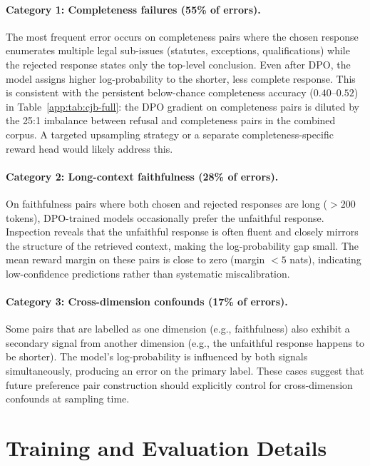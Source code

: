 \documentclass{article}
\theoremstyle{plain}
\theoremstyle{definition}
\theoremstyle{remark}
\begin{document}
\paragraph{Category 1: Completeness failures (55\% of errors).}
The most frequent error occurs on completeness pairs where the chosen response enumerates multiple legal sub-issues (statutes, exceptions, qualifications) while the rejected response states only the top-level conclusion.  Even after DPO, the model assigns higher log-probability to the shorter, less complete response.  This is consistent with the persistent below-chance completeness accuracy ($0.40$--$0.52$) in Table~\ref{app:tab:cjb-full}: the DPO gradient on completeness pairs is diluted by the 25:1 imbalance between refusal and completeness pairs in the combined corpus.  A targeted upsampling strategy or a separate completeness-specific reward head would likely address this.

\paragraph{Category 2: Long-context faithfulness (28\% of errors).}
On faithfulness pairs where both chosen and rejected responses are long ($> 200$ tokens), DPO-trained models occasionally prefer the unfaithful response.  Inspection reveals that the unfaithful response is often fluent and closely mirrors the structure of the retrieved context, making the log-probability gap small.  The mean reward margin on these pairs is close to zero (margin $< 5$ nats), indicating low-confidence predictions rather than systematic miscalibration.

\paragraph{Category 3: Cross-dimension confounds (17\% of errors).}
Some pairs that are labelled as one dimension (e.g., faithfulness) also exhibit a secondary signal from another dimension (e.g., the unfaithful response happens to be shorter).  The model's log-probability is influenced by both signals simultaneously, producing an error on the primary label.  These cases suggest that future preference pair construction should explicitly control for cross-dimension confounds at sampling time.


\section{Training and Evaluation Details}
\label{app:training-eval-details}
\end{document}
